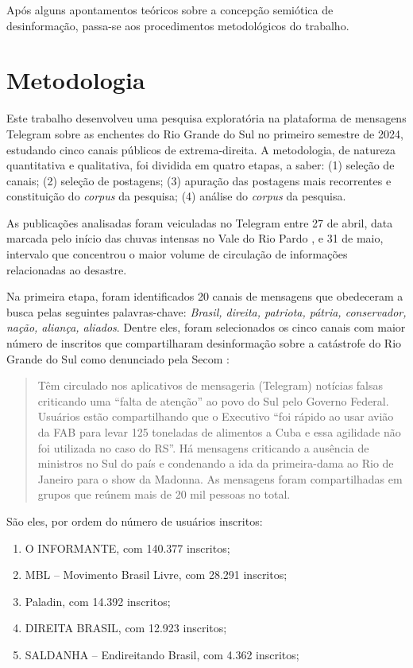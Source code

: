 \documentclass[portuguese]{textolivre}
\begin{document}
Após alguns apontamentos teóricos sobre a concepção semiótica de desinformação, passa-se aos procedimentos metodológicos do trabalho.

\section{Metodologia}\label{sec-metodologia}
Este trabalho desenvolveu uma pesquisa exploratória na plataforma de mensagens Telegram sobre as enchentes do Rio Grande do Sul no primeiro semestre de 2024, estudando cinco canais públicos de extrema-direita. A metodologia, de natureza quantitativa e qualitativa, foi dividida em quatro etapas, a saber: (1) seleção de canais; (2) seleção de postagens; (3) apuração das postagens mais recorrentes e constituição do \textit{corpus} da pesquisa; (4) análise do \textit{corpus} da pesquisa.

As publicações analisadas foram veiculadas no Telegram entre 27 de abril, data marcada pelo início das chuvas intensas no Vale do Rio Pardo \cite{bbc2024inundacoes}, e 31 de maio, intervalo que concentrou o maior volume de circulação de informações relacionadas ao desastre.

Na primeira etapa, foram identificados 20 canais de mensagens que obedeceram a busca pelas seguintes palavras-chave: \emph{Brasil, direita, patriota, pátria, conservador, nação, aliança, aliados}. Dentre eles, foram selecionados os cinco canais com maior número de inscritos que compartilharam desinformação sobre a catástrofe do Rio Grande do Sul como denunciado pela Secom \cite{agenciabrasil2024}:

\begin{quote}
    Têm circulado nos aplicativos de mensageria (Telegram) notícias falsas criticando uma ``falta de atenção'' ao povo do Sul pelo Governo Federal. Usuários estão compartilhando que o Executivo ``foi rápido ao usar avião da FAB para levar 125 toneladas de alimentos a Cuba e essa agilidade não foi utilizada no caso do RS''. Há mensagens criticando a ausência de ministros no Sul do país e condenando a ida da primeira-dama ao Rio de Janeiro para o show da Madonna. As mensagens foram compartilhadas em grupos que reúnem mais de 20 mil pessoas no total.
\end{quote}

São eles, por ordem do número de usuários inscritos:

\begin{enumerate}
    \item O INFORMANTE, com 140.377 inscritos; 
    \item MBL -- Movimento Brasil Livre, com 28.291 inscritos;
    \item Paladin, com 14.392 inscritos;
    \item DIREITA BRASIL, com 12.923 inscritos;
    \item SALDANHA -- Endireitando Brasil, com 4.362 inscritos;
\end{enumerate}
\medskip
\end{document}
